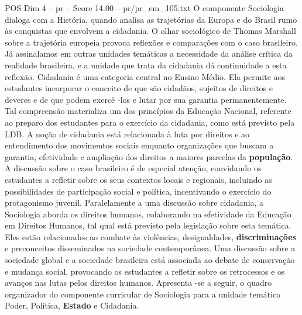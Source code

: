 \begin{textsample}{POS Dim 4 – pr – Score 14.00 – pr/pr\_em\_105.txt}
O componente Sociologia dialoga com a História, quando analisa as trajetórias da Europa e do Brasil rumo às conquistas que envolvem a cidadania.
O olhar sociológico de Thomas Marshall sobre a trajetória europeia provoca reflexões e comparações com o caso brasileiro.
Já assinalamos em outras unidades temáticas a necessidade da análise crítica da realidade brasileira, e a unidade que trata da cidadania dá continuidade a esta reflexão.
Cidadania é uma categoria central no Ensino Médio.
Ela permite aos estudantes incorporar o conceito de que são cidadãos, sujeitos de direitos e deveres e de que podem exercê -los e lutar por sua garantia permanentemente.
Tal compreensão materializa um dos princípios da Educação Nacional, referente ao preparo dos estudantes para o exercício da cidadania, como está previsto pela LDB.
A noção de cidadania está relacionada à luta por direitos e ao entendimento dos movimentos sociais enquanto organizações que buscam a garantia, efetividade e ampliação dos direitos a maiores parcelas da \textbf{população}.
A discussão sobre o caso brasileiro é de especial atenção, convidando os estudantes a refletir sobre os seus contextos locais e regionais, incluindo as possibilidades de participação social e política, incentivando o exercício do protagonismo juvenil.
Paralelamente a uma discussão sobre cidadania, a Sociologia aborda os direitos humanos, colaborando na efetividade da Educação em Direitos Humanos, tal qual está previsto pela legislação sobre esta temática.
Eles estão relacionados ao combate às violências, desigualdades, \textbf{discriminações} e preconceitos disseminados na sociedade contemporânea.
Uma discussão sobre a sociedade global e a sociedade brasileira está associada ao debate de conservação e mudança social, provocando os estudantes a refletir sobre os retrocessos e os avanços nas lutas pelos direitos humanos.
Apresenta -se a seguir, o quadro organizador do componente curricular de Sociologia para a unidade temática Poder, Política, \textbf{Estado} e Cidadania.

\end{textsample}
